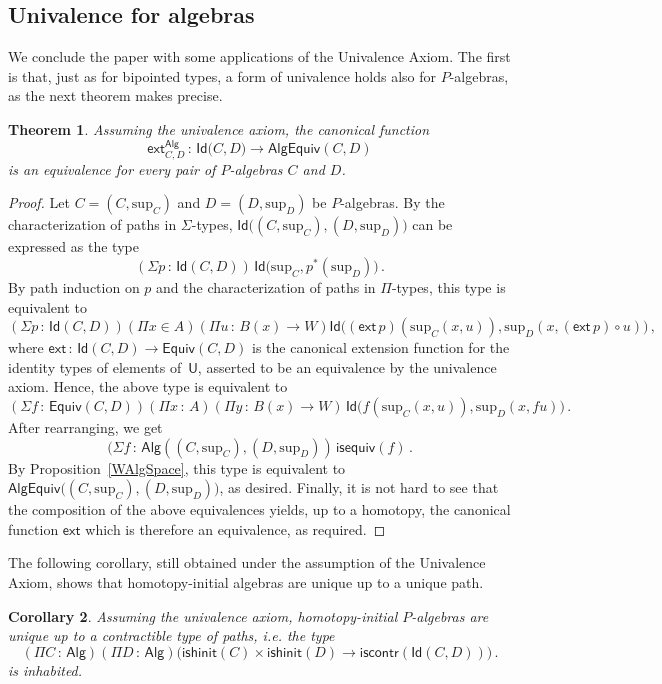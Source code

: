 \documentclass[10pt,a4paper,oneside,reqno]{amsart}
\numberwithin{equation}{section}
\theoremstyle{mythm}
\newtheorem{theorem}{Theorem}[section]
\newtheorem{corollary}[theorem]{Corollary}
\theoremstyle{mydef}
\theoremstyle{myrmk}
\newcommand{\co}{\,{:}\,}
\newcommand{\iscontr}{\mathsf{iscontr}}
\newcommand{\isequiv}{\mathsf{isequiv}}
\newcommand{\isalghinit}{\mathsf{ishinit}}
\newcommand{\ext}{\mathsf{ext}}
\newcommand{\Id}{\mathsf{Id}}
\newcommand{\U}{\mathsf{U}}
\newcommand{\Palg}{\mathsf{Alg}}
\renewcommand{\sup}{\mathrm{sup}}
\newcommand{\AlgEquiv}{\mathsf{AlgEquiv}}
\begin{document}
\subsection*{Univalence for algebras} \label{sec:univalencealgebras}
We conclude the paper with some applications of the Univalence Axiom. The first is that, just as for bipointed 
types, a form of univalence holds also for $P$-algebras, as the next theorem makes precise. 


\begin{theorem}\label{thm:Punivalence} Assuming the univalence axiom, 
 the canonical function
\[ 
\ext^\Palg_{C,D} \co \Id \big(C,D\big) \to  \AlgEquiv(C,D) 
\]
is an equivalence for every pair of $P$-algebras $C$ and $D$.
\end{theorem}

\begin{proof} 
Let $C = (C,\sup_C)$ and $D= (D,\sup_D)$ be $P$-algebras. By the characterization of paths in $\Sigma$-types, 
$\Id \big( (C,\sup_C) ,  (D,\sup_D) \big)$ can be expressed as the type
\[
(\Sigma p \co \Id(C, D)) \,  \Id \big( \sup_C ,  p^*(\sup_D)  \big) \, .
\]
By path induction on $p$ and the characterization of paths in $\Pi$-types, this type is equivalent to
\[  
(\Sigma p \co \Id(C,D))
(\Pi x \in A) 
(\Pi u \co B(x) \to W)
\Id \big(  (\ext \, p)( \sup_C(x,u)),  \sup_D(x, (\ext \, p ) \circ u) \big) \, , 
\]
where $\ext \co \Id(C,D) \to \mathsf{Equiv}(C,D)$ is the canonical extension function for the identity types of elements
of~$\U$, asserted to be an equivalence by the univalence axiom. Hence, the above type is equivalent to
\[
(\Sigma f \co \mathsf{Equiv}(C,D)) 
(\Pi x  \co A) 
(\Pi y \co B(x) \to W) \, 
\Id \big( f (\sup_C(x,u))  , \sup_D (x, f u) \big) \, .
\]
After rearranging, we get
\[
(\Sigma f \co \Palg ( (C,\sup_C),  (D,\sup_D) ) \, \isequiv( f ) \, .
\]
By Proposition~\ref{WAlgSpace}, this type is equivalent to $\AlgEquiv \big( (C,\sup_C),  (D,\sup_D)\big)$, as desired. Finally, it is not hard to see that the composition of the above equivalences yields, up to a homotopy, the canonical function $\ext$ which is therefore an equivalence, as required.
\end{proof} 

The following corollary, still obtained under the assumption of the Univalence Axiom, shows that
homotopy-initial algebras are unique up to a unique path.

\begin{corollary} \label{WHInitIso} Assuming the univalence axiom,
homotopy-initial $P$-algebras are unique up to a  contractible type of paths, i.e. the type
\[ 
(\Pi C \co \Palg) (\Pi D \co \Palg) \big( \isalghinit(C) \times \isalghinit(D)  \to 
\iscontr(\Id(C,D)) \big) \, .
\] 
is inhabited.
\end{corollary}
\end{document}
